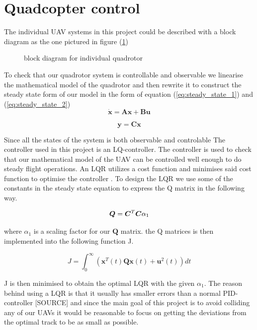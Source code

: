 \documentclass[journal]{IEEEtran}
\begin{document}
	\section{Quadcopter control}
	The individual UAV systems in this project could be described with a block diagram as the one pictured in figure (\ref{fig:block_diagram})
	\begin{figure}[h]
		\centering
		
		\caption{block diagram for individual quadrotor}
		\label{fig:block_diagram}
	\end{figure}	
	To check that our quadrotor system is controllable and observable we linearise the mathematical model of the quadrotor and then rewrite it to construct the steady state form of our model in the form of equation (\ref{eq:steady_state_1}) and (\ref{eq:steady_state_2})
	\begin{equation} \label{eq:steady_state_1}
			\bm{\dot x} = \bm{A} \bm{x} + \bm{B} \bm{u}
	\end{equation}
	
	\begin{equation} \label{eq:steady_state_2}
	\bm{y} = \bm{C} \bm{x}
	\end{equation}
	
	
	Since all the states of the system is both observable and controlable The controller used in this project is an LQ-controller. The controller is used to check that our mathematical model of the UAV can be controlled well enough to do steady flight operations.  An LQR utilizes a cost function and minimises said cost function to optimise the controller \cite{bokLQ}. To design the LQR we use some of the constants in the steady state equation to express the Q matrix in the following way.
	
	\begin{equation}
	\bm{Q}=\bm{C^}{T}\bm{C}\alpha_{1}
	\end{equation}
	
	where $\alpha_{1}$ is a scaling factor for our $\bm{Q}$ matrix.
	the Q matrices is then implemented into the following function J.
	
	\begin{equation}
	J = \int_{0}^{\infty} (\bm{x}^{T}(t)\bm{Q}\bm{x}(t)+\bm{u}^2(t)) dt
	\end{equation}
	
	 J is then minimised to obtain the optimal LQR with the given $\alpha_{1}$. The reason behind using a LQR is that it usually has smaller errors than a normal PID-controller [SOURCE] and since the main goal of this project is to avoid colliding any of our UAVs it would be reasonable to focus on getting the deviations from the optimal track to be as small as possible.   
	
\end{document}
